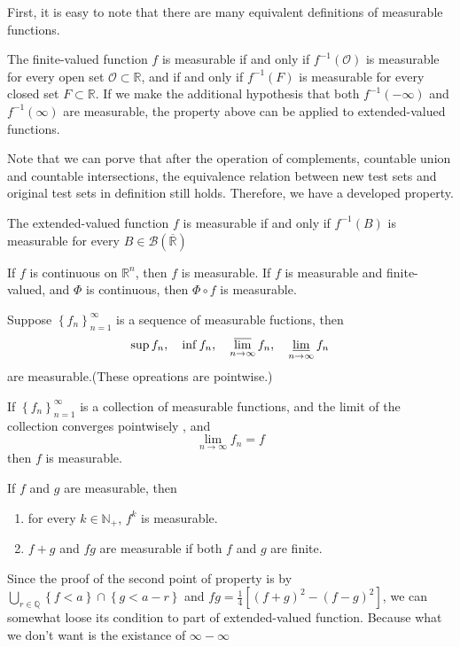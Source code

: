 \documentclass{ctexbook}
\begin{document}
First, it is easy to note that there are many equivalent definitions of measurable functions.
\begin{prop}
    The finite-valued function $f$ is measurable if and only if $f^{-1}(\mathcal{O})$ is measurable for every open set $\mathcal{O} \subset \mathbb{R}$,
    and if and only if $f^{-1}(F)$ is measurable for every closed set $F \subset \mathbb{R}$.
    If we make the additional hypothesis that both $f^{-1}(-\infty)$ and $f^{-1}(\infty)$ are measurable, the property above can be
    applied to extended-valued functions.
\end{prop}
Note that we can porve that after the operation of complements, countable union and countable intersections, the equivalence
relation between new test sets and original test sets in definition still holds. Therefore, we have a developed property.
\begin{prop}
    The extended-valued function $f$ is measurable if and only if $f^{-1}(B)$ is measurable for every $B \in \mathscr{B}(\overline{\mathbb{R}})$
\end{prop}
\begin{prop}
    If $f$ is continuous on $\mathbb{R}^n$, then $f$ is measurable. If $f$ is measurable and finite-valued, and $\Phi$ is continuous,
    then $\Phi \circ f$ is measurable. 
\end{prop}
\begin{prop}
    Suppose $\left\{f_n\right\}_{n=1}^\infty $ is a sequence of measurable fuctions, then 
    \[\sup f_n,\quad \inf f_n,\quad \varlimsup\limits_{n \rightarrow \infty} f_n,\quad \varliminf\limits_{n \rightarrow \infty} f_n\]
    are measurable.(These opreations are pointwise.)
\end{prop}
\begin{prop}
    If $\left\{f_n\right\}_{n=1}^\infty $ is a collection of measurable functions, and the limit of the collection converges pointwisely
    , and\[\lim\limits_{n \rightarrow \infty} f_n = f\]
    then $f$ is measurable.
\end{prop}
\begin{prop}
    If $f$ and $g$ are measurable, then
    \begin{enumerate}
        \item for every $k \in \mathbb{N}_+$, $f^k$ is measurable.
        \item $f+g$ and $fg$ are measurable if both $f$ and $g$ are finite.
    \end{enumerate}
\end{prop}
Since the proof of the second point of property is by $\bigcup\limits_{r \in \mathbb{Q}}\left\{f < a\right\}\cap\left\{g < a - r\right\}$
and $fg = \frac{1}{4}[(f+g)^2 - (f-g)^2]$, we can somewhat loose its condition to part of extended-valued function. Because what we
don't want is the existance of $\infty - \infty$ 
\end{document}
